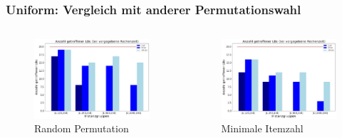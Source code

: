 \documentclass{beamer}
\begin{document}
\begin{frame}
\frametitle{Uniform: Vergleich mit anderer Permutationswahl}


\begin{columns}[c] %

\begin{figure}[!htbp]
\includegraphics[scale=0.2]{img/lb_unif.png}
\caption{Random Permutation}
\label{fig:architecture}
\end{figure}


\begin{figure}[!htbp]
\includegraphics[scale=0.2]{img/lb_unif_heuristic.png}
\caption{Minimale Itemzahl}
\label{fig:architecture}
\end{figure}


\end{columns}
\end{frame}
\end{document}
